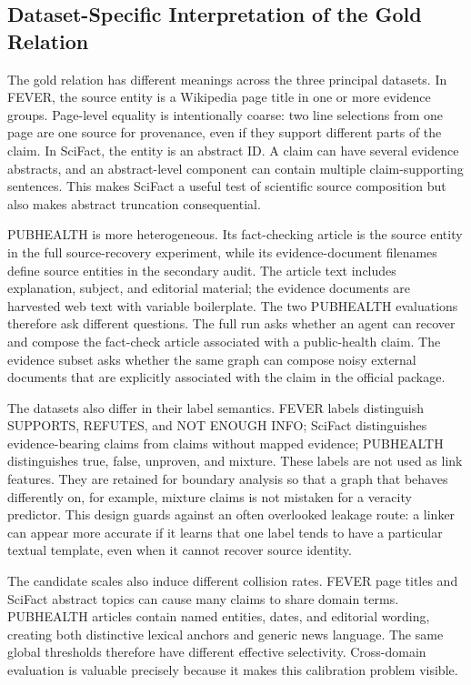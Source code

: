 \documentclass{ieeeaccess}
\begin{document}
\subsection{Dataset-Specific Interpretation of the Gold Relation}
The gold relation has different meanings across the three principal datasets. In FEVER, the source entity is a Wikipedia page title in one or more evidence groups. Page-level equality is intentionally coarse: two line selections from one page are one source for provenance, even if they support different parts of the claim. In SciFact, the entity is an abstract ID. A claim can have several evidence abstracts, and an abstract-level component can contain multiple claim-supporting sentences. This makes SciFact a useful test of scientific source composition but also makes abstract truncation consequential.

PUBHEALTH is more heterogeneous. Its fact-checking article is the source entity in the full source-recovery experiment, while its evidence-document filenames define source entities in the secondary audit. The article text includes explanation, subject, and editorial material; the evidence documents are harvested web text with variable boilerplate. The two PUBHEALTH evaluations therefore ask different questions. The full run asks whether an agent can recover and compose the fact-check article associated with a public-health claim. The evidence subset asks whether the same graph can compose noisy external documents that are explicitly associated with the claim in the official package.

The datasets also differ in their label semantics. FEVER labels distinguish SUPPORTS, REFUTES, and NOT ENOUGH INFO; SciFact distinguishes evidence-bearing claims from claims without mapped evidence; PUBHEALTH distinguishes true, false, unproven, and mixture. These labels are not used as link features. They are retained for boundary analysis so that a graph that behaves differently on, for example, mixture claims is not mistaken for a veracity predictor. This design guards against an often overlooked leakage route: a linker can appear more accurate if it learns that one label tends to have a particular textual template, even when it cannot recover source identity.

The candidate scales also induce different collision rates. FEVER page titles and SciFact abstract topics can cause many claims to share domain terms. PUBHEALTH articles contain named entities, dates, and editorial wording, creating both distinctive lexical anchors and generic news language. The same global thresholds therefore have different effective selectivity. Cross-domain evaluation is valuable precisely because it makes this calibration problem visible.
\end{document}
